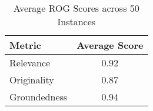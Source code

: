 
\begin{table}[h]
\centering
\begin{tabular}{lc}
\toprule
Metric & Average Score \\
\midrule
Relevance & 0.92 \\
Originality & 0.87 \\
Groundedness & 0.94 \\
\bottomrule
\end{tabular}
\caption{Average ROG Scores across 50 Instances}
\label{tab:avg_rog_score}
\end{table}
  